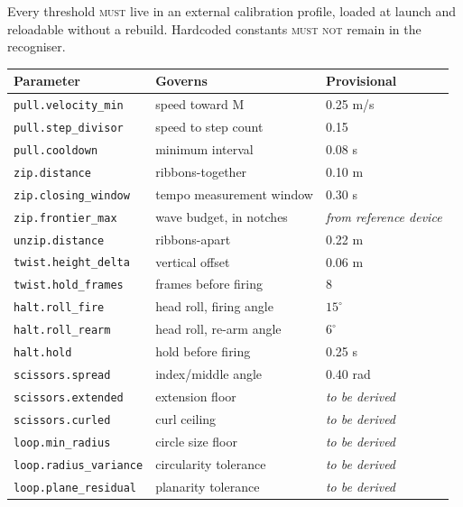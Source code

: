 \documentclass[11pt,a4paper]{article}
\newcommand{\MUST}{\textsc{must}}
\newcommand{\MUSTNOT}{\textsc{must not}}
\theoremstyle{definition}
\theoremstyle{plain}
\theoremstyle{remark}
\begin{document}
Every threshold \MUST{} live in an external calibration profile, loaded at launch and reloadable
without a rebuild. Hardcoded constants \MUSTNOT{} remain in the recogniser.

\begin{center}
\begin{tabular}{lll}
\toprule
\textbf{Parameter} & \textbf{Governs} & \textbf{Provisional} \\
\midrule
\texttt{pull.velocity\_min}    & speed toward M            & 0.25 m/s \\
\texttt{pull.step\_divisor}    & speed to step count       & 0.15 \\
\texttt{pull.cooldown}         & minimum interval          & 0.08 s \\
\texttt{zip.distance}          & ribbons-together          & 0.10 m \\
\texttt{zip.closing\_window}   & tempo measurement window  & 0.30 s \\
\texttt{zip.frontier\_max}     & wave budget, in notches   & \emph{from reference device} \\
\texttt{unzip.distance}        & ribbons-apart             & 0.22 m \\
\texttt{twist.height\_delta}   & vertical offset           & 0.06 m \\
\texttt{twist.hold\_frames}    & frames before firing      & 8 \\
\texttt{halt.roll\_fire}       & head roll, firing angle   & $15^\circ$ \\
\texttt{halt.roll\_rearm}      & head roll, re-arm angle   & $6^\circ$ \\
\texttt{halt.hold}             & hold before firing        & 0.25 s \\
\texttt{scissors.spread}       & index/middle angle        & 0.40 rad \\
\texttt{scissors.extended}     & extension floor           & \emph{to be derived} \\
\texttt{scissors.curled}       & curl ceiling              & \emph{to be derived} \\
\texttt{loop.min\_radius}      & circle size floor         & \emph{to be derived} \\
\texttt{loop.radius\_variance} & circularity tolerance     & \emph{to be derived} \\
\texttt{loop.plane\_residual}  & planarity tolerance       & \emph{to be derived} \\
\bottomrule
\end{tabular}
\end{center}
\end{document}
